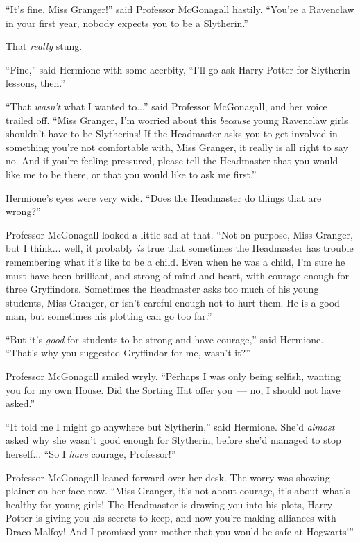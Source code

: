 ``It's fine, Miss Granger!'' said Professor McGonagall hastily. ``You're a Ravenclaw in your first year, nobody expects you to be a Slytherin.''

That \emph{really} stung.

``Fine,'' said Hermione with some acerbity, ``I'll go ask Harry Potter for Slytherin lessons, then.''

``That \emph{wasn't} what I wanted to...'' said Professor McGonagall, and her voice trailed off. ``Miss Granger, I'm worried about this \emph{because} young Ravenclaw girls shouldn't have to be Slytherins! If the Headmaster asks you to get involved in something you're not comfortable with, Miss Granger, it really is all right to say no. And if you're feeling pressured, please tell the Headmaster that you would like me to be there, or that you would like to ask me first.''

Hermione's eyes were very wide. ``Does the Headmaster do things that are wrong?''

Professor McGonagall looked a little sad at that. ``Not on purpose, Miss Granger, but I think... well, it probably \emph{is} true that sometimes the Headmaster has trouble remembering what it's like to be a child. Even when he was a child, I'm sure he must have been brilliant, and strong of mind and heart, with courage enough for three Gryffindors. Sometimes the Headmaster asks too much of his young students, Miss Granger, or isn't careful enough not to hurt them. He is a good man, but sometimes his plotting can go too far.''

``But it's \emph{good} for students to be strong and have courage,'' said Hermione. ``That's why you suggested Gryffindor for me, wasn't it?''

Professor McGonagall smiled wryly. ``Perhaps I was only being selfish, wanting you for my own House. Did the Sorting Hat offer you~--- no, I should not have asked.''

``It told me I might go anywhere but Slytherin,'' said Hermione. She'd \emph{almost} asked why she wasn't good enough for Slytherin, before she'd managed to stop herself... ``So I \emph{have} courage, Professor!''

Professor McGonagall leaned forward over her desk. The worry was showing plainer on her face now. ``Miss Granger, it's not about courage, it's about what's healthy for young girls! The Headmaster is drawing you into his plots, Harry Potter is giving you his secrets to keep, and now you're making alliances with Draco Malfoy! And I promised your mother that you would be safe at Hogwarts!''

